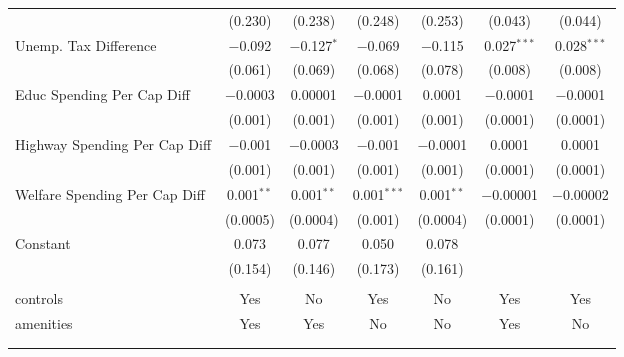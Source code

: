 \begin{table}[!htbp]
\begin{tabular}{@{\extracolsep{5pt}}lcccccc}
  & (0.230) & (0.238) & (0.248) & (0.253) & (0.043) & (0.044) \\ 
  Unemp. Tax Difference & $-$0.092 & $-$0.127$^{*}$ & $-$0.069 & $-$0.115 & 0.027$^{***}$ & 0.028$^{***}$ \\ 
  & (0.061) & (0.069) & (0.068) & (0.078) & (0.008) & (0.008) \\ 
  Educ Spending Per Cap Diff & $-$0.0003 & 0.00001 & $-$0.0001 & 0.0001 & $-$0.0001 & $-$0.0001 \\ 
  & (0.001) & (0.001) & (0.001) & (0.001) & (0.0001) & (0.0001) \\ 
  Highway Spending Per Cap Diff & $-$0.001 & $-$0.0003 & $-$0.001 & $-$0.0001 & 0.0001 & 0.0001 \\ 
  & (0.001) & (0.001) & (0.001) & (0.001) & (0.0001) & (0.0001) \\ 
  Welfare Spending Per Cap Diff & 0.001$^{**}$ & 0.001$^{**}$ & 0.001$^{***}$ & 0.001$^{**}$ & $-$0.00001 & $-$0.00002 \\ 
  & (0.0005) & (0.0004) & (0.001) & (0.0004) & (0.0001) & (0.0001) \\ 
  Constant & 0.073 & 0.077 & 0.050 & 0.078 &  &  \\ 
  & (0.154) & (0.146) & (0.173) & (0.161) &  &  \\ 
 \hline \\[-1.8ex] 
controls & Yes & No & Yes & No & Yes & Yes \\ 
amenities & Yes & Yes & No & No & Yes & No \\ 
\hline \\[-1.8ex] 
\hline 
\hline \\[-1.8ex] 
\end{tabular} 
\end{table} 
